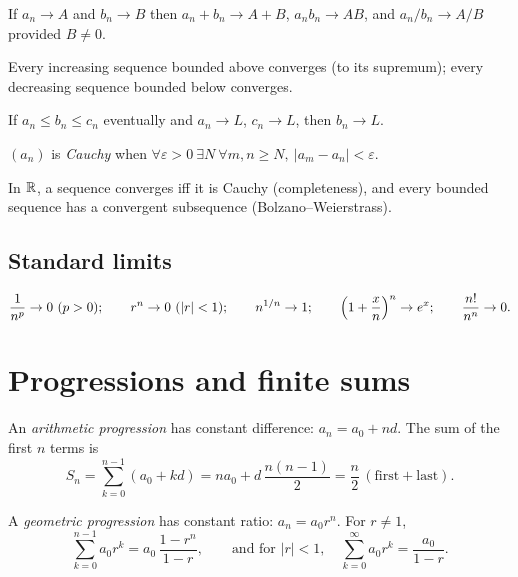 \begin{theorem}
If $a_n \to A$ and $b_n \to B$ then
$a_n + b_n \to A + B$, $a_n b_n \to AB$, and
$a_n / b_n \to A/B$ provided $B \neq 0$.
\end{theorem}

\begin{theorem}\label{thm:mct}
Every increasing sequence bounded above converges (to its supremum);
every decreasing sequence bounded below converges.
\end{theorem}

\begin{theorem}[Squeeze]
If $a_n \leq b_n \leq c_n$ eventually and $a_n \to L$, $c_n \to L$, then
$b_n \to L$.
\end{theorem}

\begin{definition}
$(a_n)$ is \emph{Cauchy} when
$\forall \varepsilon > 0\ \exists N\ \forall m, n \geq N,\
|a_m - a_n| < \varepsilon$.
\end{definition}

In $\mathbb{R}$, a sequence converges iff it is Cauchy (completeness), and every
bounded sequence has a convergent subsequence (Bolzano--Weierstrass).

\subsection{Standard limits}

\[
\frac{1}{n^p} \to 0\ (p>0); \qquad
r^n \to 0\ (|r|<1); \qquad
n^{1/n} \to 1; \qquad
\Bigl(1 + \frac{x}{n}\Bigr)^{n} \to e^{x}; \qquad
\frac{n!}{n^n} \to 0 .
\]

\section{Progressions and finite sums}

\begin{definition}[AP]
An \emph{arithmetic progression} has constant difference:
$a_n = a_0 + nd$. The sum of the first $n$ terms is
\[
S_n = \sum_{k=0}^{n-1} (a_0 + kd) = n a_0 + d\,\frac{n(n-1)}{2}
= \frac{n}{2}\,(\text{first} + \text{last}).
\]
\end{definition}

\begin{definition}[GP]
A \emph{geometric progression} has constant ratio: $a_n = a_0 r^n$. For
$r \neq 1$,
\[
\sum_{k=0}^{n-1} a_0 r^{k} = a_0\,\frac{1 - r^{n}}{1 - r},
\qquad\text{and for } |r| < 1,\quad
\sum_{k=0}^{\infty} a_0 r^{k} = \frac{a_0}{1 - r}.
\]
\end{definition}

